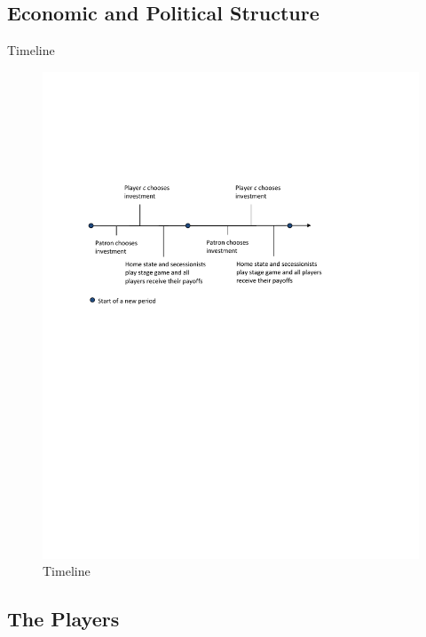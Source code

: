 \documentclass[handout]{beamer}
\begin{document}
\subsection{Economic and Political Structure}
\begin{frame}{Timeline}
\pause
\begin{figure}
\includegraphics[width=\linewidth,height=\textheight,keepaspectratio]{Timeline2.pdf}
\caption{Timeline}
\end{figure}
\end{frame}


\subsection{The Players}
\end{document}

